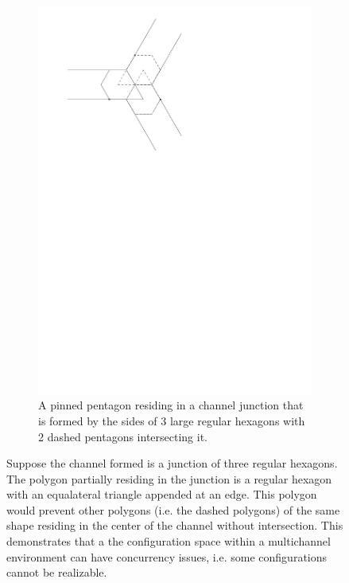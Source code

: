 \begin{figure}[h]
\begin{center}
\begin{subfigure}[b]{0.49\textwidth}
	  \includegraphics[width=\textwidth]{graphics/switchTerminalFinalized3.pdf}
	  \caption{A pinned pentagon residing in a channel junction that is formed by the sides of 3 large regular hexagons with 2 dashed pentagons intersecting it.}
	  \label{fig:linkage-2-2}
  \end{subfigure}
\caption{Suppose the channel formed is a junction of three regular hexagons.  The polygon partially residing in the junction is a regular hexagon with an equalateral triangle appended at an edge.  This polygon would prevent other polygons (i.e. the dashed polygons) of the same shape residing in the center of the channel without intersection. This demonstrates that a the configuration space within a multichannel environment can have concurrency issues, i.e. some configurations cannot be realizable.}
\end{center} \label{fig:linkage-2}
\end{figure}\newpage

